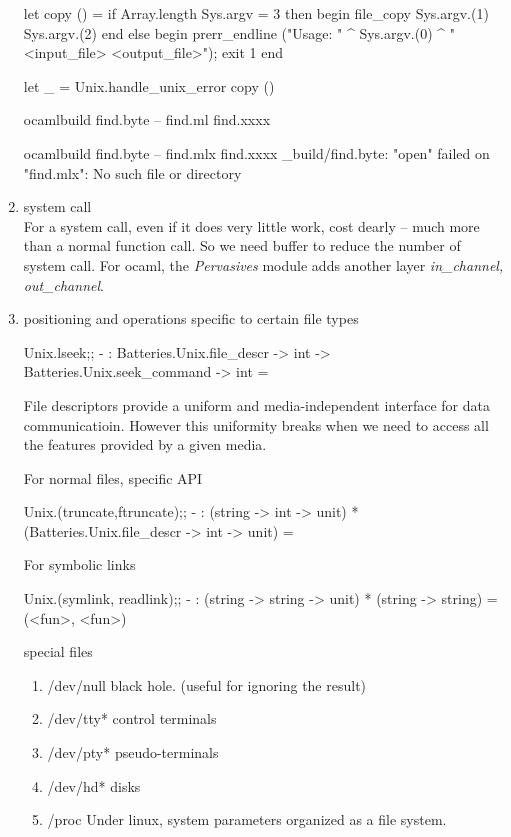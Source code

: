 \begin{enumerate}
\begin{bluecode}
let copy () = 
  if Array.length Sys.argv = 3 then begin 
    file_copy Sys.argv.(1) Sys.argv.(2)
  end 
  else begin 
    prerr_endline 
      ("Usage: " ^ Sys.argv.(0) ^ "<input_file> <output_file>"); 
    exit 1 
  end 

let _  = Unix.handle_unix_error copy () 
\end{bluecode}

\begin{bluetext}
ocamlbuild find.byte -- find.ml find.xxxx    
\end{bluetext}

\begin{alternate}
ocamlbuild find.byte -- find.mlx find.xxxx
_build/find.byte: "open" failed on "find.mlx": No such file or directory
\end{alternate}
\item  system call \\
  For a system call, even if it does very little work, cost dearly --
  much more than a normal function call. So we need buffer to reduce
  the number of system call. For ocaml, the \textit{Pervasives} module
  adds another layer \textit{in\_channel, out\_channel}.

\item positioning and operations specific to certain file types

  \begin{alternate}
Unix.lseek;;
- : Batteries.Unix.file_descr -> int -> Batteries.Unix.seek_command -> int =
\end{alternate}

  File descriptors provide a uniform and media-independent interface
  for data communicatioin. However this uniformity breaks when we need
  to access all the features provided by a given media.

  For normal files, specific API
  \begin{bluecode}
Unix.(truncate,ftruncate);;
- : (string -> int -> unit) * (Batteries.Unix.file_descr -> int -> unit) =
\end{bluecode}
For symbolic links
\begin{bluecode}
Unix.(symlink, readlink);;
- : (string -> string -> unit) * (string -> string) = (<fun>, <fun>)  
\end{bluecode}

special files
\begin{enumerate}
\item /dev/null  black hole. (useful for ignoring the result)
\item /dev/tty* control terminals
\item /dev/pty* pseudo-terminals
\item /dev/hd* disks
\item /proc Under linux, system parameters organized as a file system.
\end{enumerate}


\end{enumerate}
